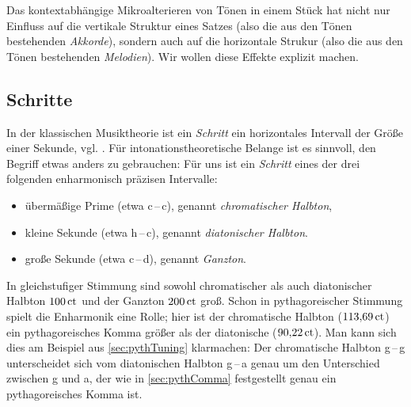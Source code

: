 Das kontextabhängige Mikroalterieren von Tönen in einem Stück hat nicht nur
Einfluss auf die vertikale Struktur eines Satzes (also die aus den Tönen
bestehenden \emph{Akkorde}), sondern auch auf die horizontale Strukur (also die
aus den Tönen bestehenden \emph{Melodien}). Wir wollen diese Effekte explizit
machen.

\subsection{Schritte}
\label{sec:steps}

In der klassischen Musiktheorie ist ein \emph{Schritt} ein horizontales
Intervall der Größe einer Sekunde, vgl. \cite[{}7.1]{Skript}.  Für
intonationstheoretische Belange ist es sinnvoll, den Begriff etwas anders zu
gebrauchen: Für uns ist ein \emph{Schritt} eines der drei folgenden enharmonisch
präzisen Intervalle:
\begin{itemize}[itemsep=0em]
\item übermäßige Prime (etwa c\,–\,\sharp c), genannt
  \emph{chromatischer Halbton},
\item kleine Sekunde (etwa h\,–\,c), genannt
  \emph{diatonischer Halbton}.
\item große Sekunde (etwa c\,–\,d), genannt
  \emph{Ganzton}.
\end{itemize}
In gleichstufiger Stimmung sind sowohl chromatischer als auch diatonischer
Halbton $100\,\text{ct}$ und der Ganzton $200\,\text{ct}$ groß.  Schon in pythagoreischer
Stimmung spielt die Enharmonik eine Rolle; hier ist der chromatische Halbton
($113{,}69\,\text{ct}$) ein pythagoreisches Komma größer als der diatonische
($90{,}22\,\text{ct}$). Man kann sich dies am Beispiel aus \cref{sec:pythTuning}
klarmachen: Der chromatische Halbton g\,–\,\sharp g unterscheidet sich vom
diatonischen Halbton g\,–\,\flat a genau um den Unterschied zwischen \sharp g
und \flat a, der wie in \cref{sec:pythComma} festgestellt genau ein
pythagoreisches Komma ist.

